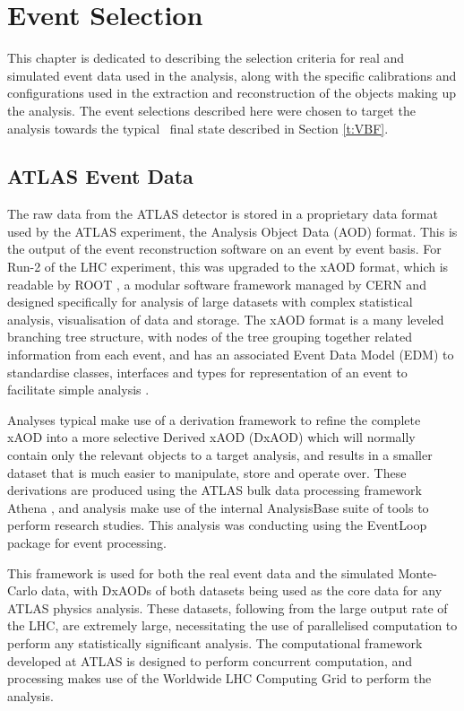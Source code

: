 \chapter{Event Selection}\label{c:ES}

	This chapter is dedicated to describing the selection criteria for real and simulated event data used in the analysis, along with the specific calibrations and configurations used in the extraction and reconstruction of the objects making up the analysis. The event selections described here were chosen to target the analysis towards the typical \VBFHBB\, final state described in Section \ref{t:VBF}.

	\section{ATLAS Event Data}

	The raw data from the ATLAS detector is stored in a proprietary data format used by the ATLAS experiment, the Analysis Object Data (AOD) format. This is the output of the event reconstruction software on an event by event basis. For Run-2 of the LHC experiment, this was upgraded to the xAOD format, which is readable by ROOT \cite{ROOT}, a modular software framework managed by CERN and designed specifically for analysis of large datasets with complex statistical analysis, visualisation of data and storage. The xAOD format is a many leveled branching tree structure, with nodes of the tree grouping together related information from each event, and has an associated Event Data Model (EDM) to standardise classes, interfaces and types for representation of an event to facilitate simple analysis \cite{xAOD}.

	Analyses typical make use of a derivation framework to refine the complete xAOD into a more selective Derived xAOD (DxAOD) which will normally contain only the relevant objects to a target analysis, and results in a smaller dataset that is much easier to manipulate, store and operate over. These derivations are produced using the ATLAS bulk data processing framework Athena \cite{athena}, and analysis make use of the internal AnalysisBase suite of tools to perform research studies. This analysis was conducting using the EventLoop package for event processing.

	This framework is used for both the real event data and the simulated Monte-Carlo data, with DxAODs of both datasets being used as the core data for any ATLAS physics analysis. These datasets, following from the large output rate of the LHC, are extremely large, necessitating the use of parallelised computation to perform any statistically significant analysis. The computational framework developed at ATLAS is designed to perform concurrent computation, and processing makes use of the Worldwide LHC Computing Grid \cite{grid} to perform the analysis.


